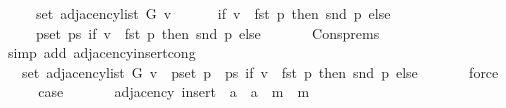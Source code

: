 \begin{isabellebody}
\ \ \ \ \ set\ {\isacharparenleft}{\kern0pt}adjacency{\isacharunderscore}{\kern0pt}list\ G\ v{\isacharparenright}{\kern0pt}\ {\isasymunion}\isanewline
\ \ \ \ \ {\isacharparenleft}{\kern0pt}if\ v\ {\isacharequal}{\kern0pt}\ fst\ p\ then\ {\isacharbraceleft}{\kern0pt}snd\ p{\isacharbraceright}{\kern0pt}\ else\ {\isacharbraceleft}{\kern0pt}{\isacharbraceright}{\kern0pt}{\isacharparenright}{\kern0pt}\ {\isasymunion}\isanewline
\ \ \ \ \ {\isacharparenleft}{\kern0pt}{\isasymUnion}p{\isasymin}set\ ps{\isachardot}{\kern0pt}\ if\ v\ {\isacharequal}{\kern0pt}\ fst\ p\ then\ {\isacharbraceleft}{\kern0pt}snd\ p{\isacharbraceright}{\kern0pt}\ else\ {\isacharbraceleft}{\kern0pt}{\isacharbraceright}{\kern0pt}{\isacharparenright}{\kern0pt}{\isachardoublequoteclose}\isanewline
\ \ \ \ \isamarkupfalse%
\ Cons{\isachardot}{\kern0pt}prems\isanewline
\ \ \ \ \isamarkupfalse%
\ {\isacharparenleft}{\kern0pt}simp\ add{\isacharcolon}{\kern0pt}\ adjacency{\isacharunderscore}{\kern0pt}insert{\isacharunderscore}{\kern0pt}cong{\isacharparenright}{\kern0pt}\isanewline
\ \ \isamarkupfalse%
\ \isamarkupfalse%
\ {\isachardoublequoteopen}{\isachardot}{\kern0pt}{\isachardot}{\kern0pt}{\isachardot}{\kern0pt}\ {\isacharequal}{\kern0pt}\ set\ {\isacharparenleft}{\kern0pt}adjacency{\isacharunderscore}{\kern0pt}list\ G\ v{\isacharparenright}{\kern0pt}\ {\isasymunion}\ {\isacharparenleft}{\kern0pt}{\isasymUnion}p{\isasymin}set\ {\isacharparenleft}{\kern0pt}p\ {\isacharhash}{\kern0pt}\ ps{\isacharparenright}{\kern0pt}{\isachardot}{\kern0pt}\ if\ v\ {\isacharequal}{\kern0pt}\ fst\ p\ then\ {\isacharbraceleft}{\kern0pt}snd\ p{\isacharbraceright}{\kern0pt}\ else\ {\isacharbraceleft}{\kern0pt}{\isacharbraceright}{\kern0pt}{\isacharparenright}{\kern0pt}{\isachardoublequoteclose}\isanewline
\ \ \ \ \isamarkupfalse%
\ force\isanewline
\ \ \isamarkupfalse%
\ \isamarkupfalse%
\ {\isacharquery}{\kern0pt}case\isanewline
\ \ \ \ \isacommand{{\isachardot}{\kern0pt}}\isamarkupfalse%
\isanewline
{}\isamarkupfalse%
%
\endisatagproof
{\isafoldproof}%
%
\isadelimproof
\isanewline
%
\endisadelimproof
\isanewline
{}\isamarkupfalse%
\ {\isacharparenleft}{\kern0pt}\ adjacency{\isacharparenright}{\kern0pt}\ insert{\isacharprime}{\kern0pt}\ {\isacharcolon}{\kern0pt}{\isacharcolon}{\kern0pt}\ {\isachardoublequoteopen}{\isacharprime}{\kern0pt}a\ {\isasymRightarrow}\ {\isacharprime}{\kern0pt}a\ {\isasymRightarrow}\ {\isacharprime}{\kern0pt}m\ {\isasymRightarrow}\ {\isacharprime}{\kern0pt}m{\isachardoublequoteclose}\ \isanewline

\end{isabellebody}
